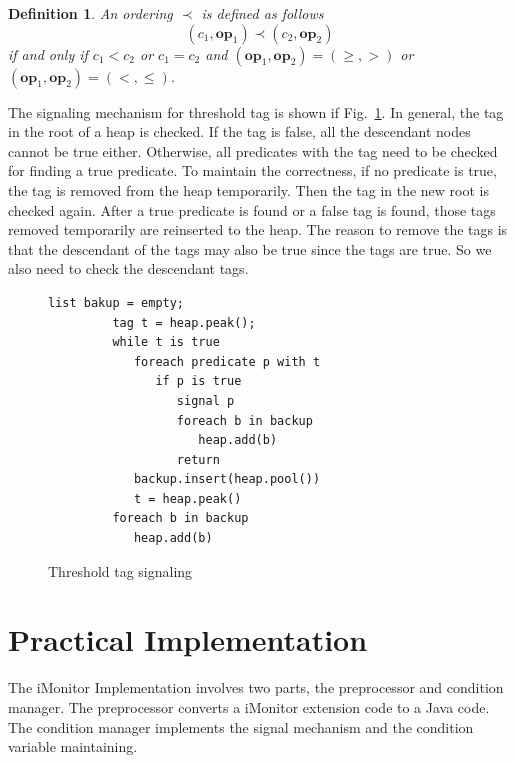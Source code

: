 \documentclass[preprint]{sigplanconf}
\newtheorem{definition}{Definition}
\begin{document}
\begin{definition} \label{def:th_order}
    An ordering $\prec$ is defined as follows
\[
   (c_1, \boldsymbol{op}_1) \prec (c_2, \boldsymbol{op}_2)
\]
if and only if $c_1 < c_2$ or $c_1 = c_2$ and $(\boldsymbol{op}_1,
\boldsymbol{op}_2)  = (\ge, >)$ or $(\boldsymbol{op}_1, \boldsymbol{op}_2) =
(<, \le)$. 
\end{definition}

The signaling mechanism for threshold tag is shown if Fig.~\ref{fig:th_sig}. In
general, the tag in the root of a heap is checked. If the tag is false, all the
descendant nodes cannot be true either. Otherwise, all predicates with the tag
need to be checked for finding a true predicate. To maintain the correctness, 
if no predicate is true, the tag is removed from the heap temporarily. Then the
tag in the new root is checked again. After a true predicate is found or a
false tag is found, those tags removed temporarily are reinserted to the heap.
The reason to remove the tags is that the descendant of the tags may also be
true since the tags are true. So we also need to check the descendant tags.
\begin{figure}[ht!]
    \begin{Verbatim}[fontsize=\footnotesize,gobble=8,frame=lines,
            framesep=3mm]
         list bakup = empty;
         tag t = heap.peak();
         while t is true
            foreach predicate p with t
               if p is true
                  signal p
                  foreach b in backup 
                     heap.add(b)
                  return
            backup.insert(heap.pool())
            t = heap.peak()
         foreach b in backup 
            heap.add(b)
    \end{Verbatim}
  \caption{Threshold tag signaling}
  \label{fig:th_sig}
\end{figure}




\section{Practical Implementation} \label{sec:imp}
The iMonitor Implementation involves two parts, the preprocessor and condition
manager. The preprocessor converts a iMonitor extension code to a Java code.
The condition manager implements the signal mechanism and the condition
variable maintaining. 
\end{document}
